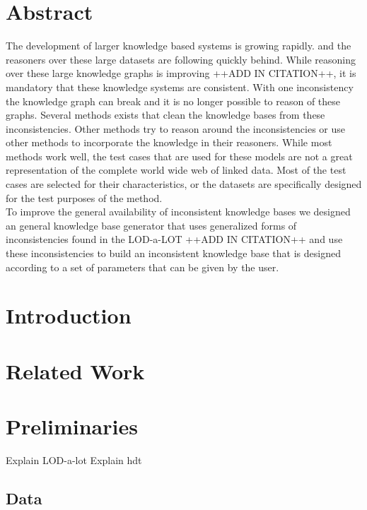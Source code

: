 \documentclass{article}
\begin{document}
\section*{Abstract}
The development of larger knowledge based systems is growing rapidly. and the reasoners over these large datasets are following quickly behind. While reasoning over these large knowledge graphs is improving ++ADD IN CITATION++, it is mandatory that these knowledge systems are consistent. With one inconsistency the knowledge graph can break and it is no longer possible to reason of these graphs. Several methods exists that clean the knowledge bases from these inconsistencies. Other methods try to reason around the inconsistencies or use other methods to incorporate the knowledge in their reasoners. While most methods work well, the test cases that are used for these models are not a great representation of the complete world wide web of linked data. Most of the test cases are selected for their characteristics, or the datasets are specifically designed for the test purposes of the method.\\
To improve the general availability of inconsistent knowledge bases we designed an general knowledge base generator that uses generalized forms of inconsistencies found in the LOD-a-LOT ++ADD IN CITATION++ and use these inconsistencies to build an inconsistent knowledge base that is designed according to a set of parameters that can be given by the user.\\


\newpage
\tableofcontents
\newpage
{}

\section{Introduction}


\newpage
\section{Related Work}


\newpage
\section{Preliminaries}
Explain LOD-a-lot
Explain hdt

\subsection{Data}
\end{document}
